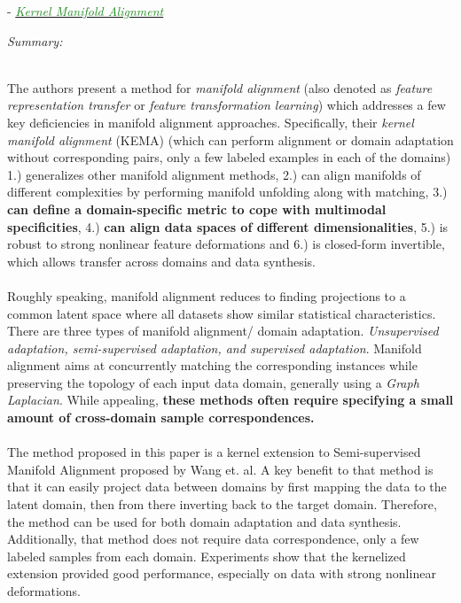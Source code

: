 \documentclass[]{article}
\newcommand{\paperentry}[4]{
            \hangindent=1cm
            \cite{#1} - \href{run:../References/#3}{\textcolor{ForestGreen}{\textit{#2}}}
            
            \noindent            
            \begin{minipage}[t]{0.1\linewidth}\hfill\end{minipage}
            \begin{minipage}[t]{0.8\linewidth}\textcolor{NavyBlue}{{\textit{Summary:}}}#4\end{minipage}
            \vspace{.25cm}
          }
\begin{document}
		\paperentry{Tuia2015KernelManifoldAlignment}
		{Kernel Manifold Alignment}
		{Manifold_Representation_Learning/Alignment/Tuia2015KernelManifoldAlignment.pdf}
		{}\\
		The authors present a method for \textit{manifold alignment} (also denoted as \textit{feature representation transfer} or \textit{feature transformation learning}) 
		which addresses a few key deficiencies in manifold alignment approaches. Specifically, their \textit{kernel manifold alignment} (KEMA) (which can perform alignment or domain adaptation without corresponding pairs, only a few labeled examples in each of the domains) 1.) generalizes other manifold alignment methods, 2.) can align manifolds of different complexities by performing manifold unfolding along with matching, 3.) \textbf{can define a domain-specific metric to cope with multimodal specificities}, 4.) \textbf{can align data spaces of different dimensionalities}, 5.) is robust to strong nonlinear feature deformations and 6.) is closed-form invertible, which allows transfer across domains and data synthesis.
		\\ \\
		Roughly speaking, manifold alignment reduces to finding projections to a common latent space where all datasets show similar statistical characteristics.  There are three types of manifold alignment/ domain adaptation.  \textit{Unsupervised adaptation, semi-supervised adaptation, and supervised adaptation}.  Manifold alignment aims at concurrently matching the corresponding instances while preserving the topology of each input data domain, generally using a \textit{Graph Laplacian}.  While appealing, \textbf{these methods often require specifying a small amount of cross-domain sample correspondences.}
		\\ \\
		The method proposed in this paper is a kernel extension to Semi-supervised Manifold Alignment proposed by Wang et. al.  A key benefit to that method is that it can easily project data between domains by first mapping the data to the latent domain, then from there inverting back to the target domain.  Therefore, the method can be used for both domain adaptation and data synthesis.  Additionally, that method does not require data correspondence, only a few labeled samples from each domain.  Experiments show that the kernelized extension provided good performance, especially on data with strong nonlinear deformations. \\
		
\end{document}
